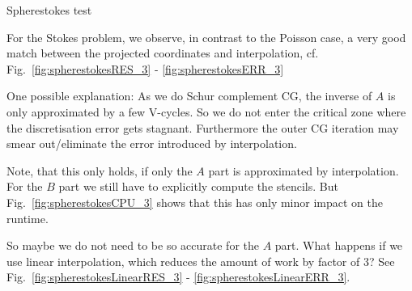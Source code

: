 \documentclass[a4paper,11pt,reqno]{amsart}
\numberwithin{figure}{section}
\numberwithin{table}{section}
\begin{document}
\begin{section}{Spherestokes test}


For the Stokes problem, we observe, in contrast to the Poisson case,
a very good match between the projected coordinates and interpolation,
cf. Fig.~\ref{fig:spherestokesRES_3} - \ref{fig:spherestokesERR_3}

One possible explanation:
As we do Schur complement CG, the inverse of $A$ is only 
approximated by a few V-cycles. So we do not enter the 
critical zone where the discretisation error
gets stagnant. Furthermore the outer CG iteration may 
smear out/eliminate the error introduced by interpolation.

Note, that this only holds, if only the $A$ part is approximated by
interpolation. For the $B$ part we still have to explicitly compute the
stencils. But Fig.~\ref{fig:spherestokesCPU_3} shows that this has only
minor impact on the runtime.

So maybe we do not need to be so accurate for the $A$ part. What happens
if we use linear interpolation, which reduces the amount of work by
factor of 3? See 
Fig.~\ref{fig:spherestokesLinearRES_3} - \ref{fig:spherestokesLinearERR_3}.



\end{section}
\end{document}
